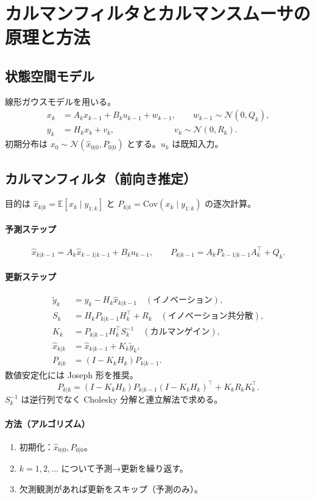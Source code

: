 \section{カルマンフィルタとカルマンスムーサの原理と方法}

\subsection{状態空間モデル}
線形ガウスモデルを用いる。
\[
\begin{aligned}
  x_k &= A_k x_{k-1} + B_k u_{k-1} + w_{k-1},\qquad w_{k-1}\sim\mathcal N(0,Q_k),\\
  y_k &= H_k x_k + v_k,\qquad\qquad\qquad\quad v_k\sim\mathcal N(0,R_k).
\end{aligned}
\]
初期分布は $x_0\sim\mathcal N(\hat x_{0|0},P_{0|0})$ とする。$u_k$ は既知入力。\cite{exp2025}

\subsection{カルマンフィルタ（前向き推定）}
目的は $\hat x_{k|k}=\mathbb E[x_k\mid y_{1:k}]$ と $P_{k|k}=\mathrm{Cov}(x_k\mid y_{1:k})$ の逐次計算。

\paragraph{予測ステップ}
\[
\hat x_{k|k-1}=A_k \hat x_{k-1|k-1}+B_k u_{k-1},\qquad
P_{k|k-1}=A_k P_{k-1|k-1} A_k^\top + Q_k.
\]

\paragraph{更新ステップ}
\[
\begin{aligned}
  \tilde y_k &= y_k - H_k \hat x_{k|k-1}\quad(\text{イノベーション}),\\
  S_k &= H_k P_{k|k-1} H_k^\top + R_k\quad(\text{イノベーション共分散}),\\
  K_k &= P_{k|k-1} H_k^\top S_k^{-1}\quad(\text{カルマンゲイン}),\\
  \hat x_{k|k} &= \hat x_{k|k-1} + K_k \tilde y_k,\\
  P_{k|k} &= (I - K_k H_k) P_{k|k-1}. 
\end{aligned}
\]
数値安定化には Joseph 形を推奨。
\[
P_{k|k}=(I-K_k H_k)P_{k|k-1}(I-K_k H_k)^\top + K_k R_k K_k^\top.
\]
$S_k^{-1}$ は逆行列でなく Cholesky 分解と連立解法で求める。\cite{exp2025}

\paragraph{方法（アルゴリズム）}
\begin{enumerate}\setlength{\itemsep}{2pt}
  \item 初期化：$\hat x_{0|0},P_{0|0}$。
  \item $k=1,2,\dots$ について予測→更新を繰り返す。
  \item 欠測観測があれば更新をスキップ（予測のみ）。
\end{enumerate}

